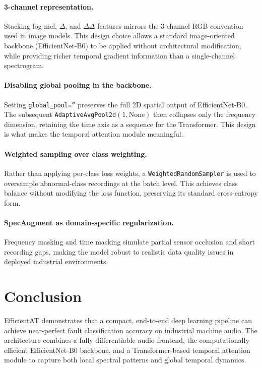 \documentclass[12pt,a4paper]{article}
\begin{document}
\paragraph{3-channel representation.} Stacking log-mel, $\Delta$, and $\Delta\Delta$ features mirrors the 3-channel RGB convention used in image models. This design choice allows a standard image-oriented backbone (EfficientNet-B0) to be applied without architectural modification, while providing richer temporal gradient information than a single-channel spectrogram.

\paragraph{Disabling global pooling in the backbone.} Setting \texttt{global\_pool=''} preserves the full 2D spatial output of EfficientNet-B0. The subsequent \texttt{AdaptiveAvgPool2d}$(1, \text{None})$ then collapses only the frequency dimension, retaining the time axis as a sequence for the Transformer. This design is what makes the temporal attention module meaningful.

\paragraph{Weighted sampling over class weighting.} Rather than applying per-class loss weights, a \texttt{WeightedRandomSampler} is used to oversample abnormal-class recordings at the batch level. This achieves class balance without modifying the loss function, preserving its standard cross-entropy form.

\paragraph{SpecAugment as domain-specific regularization.} Frequency masking and time masking simulate partial sensor occlusion and short recording gaps, making the model robust to realistic data quality issues in deployed industrial environments.

\section{Conclusion}

EfficientAT demonstrates that a compact, end-to-end deep learning pipeline can achieve near-perfect fault classification accuracy on industrial machine audio. The architecture combines a fully differentiable audio frontend, the computationally efficient EfficientNet-B0 backbone, and a Transformer-based temporal attention module to capture both local spectral patterns and global temporal dynamics.
\end{document}
